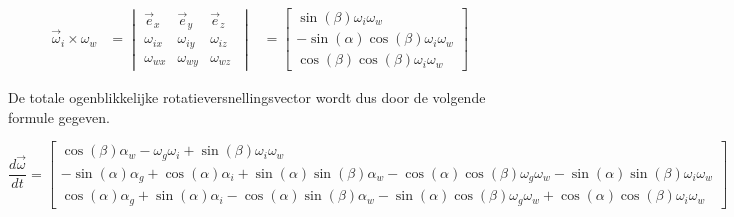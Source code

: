 \begin{equation*}
\begin{split}
\overrightarrow{\omega}_{i}\times\omega_{w}
&=	\begin{vmatrix}
	\overrightarrow{e}_{x} & \overrightarrow{e}_{y} & \overrightarrow{e}_{z}\\
	\omega_{ix} & \omega_{iy} & \omega_{iz}\\
	\omega_{wx} & \omega_{wy} & \omega_{wz}\
	\end{vmatrix}
&=	\begin{bmatrix}
	\sin(\beta)\omega_{i}\omega_{w}\\
	-\sin(\alpha)\cos(\beta)\omega_{i}\omega_{w}\\
	\cos(\beta)\cos(\beta)\omega_{i}\omega_{w}\
	\end{bmatrix}
\end{split}
\end{equation*}

De totale ogenblikkelijke rotatieversnellingsvector wordt dus door de volgende formule gegeven.

\begin{equation*}
\frac{d\overrightarrow{\omega}}{dt}
=	\begin{bmatrix}
\cos(\beta)\alpha_{w}-\omega_{g}\omega_{i}+\sin(\beta)\omega_{i}\omega_{w}\\
-\sin(\alpha)\alpha_{g}+\cos(\alpha)\alpha_{i}+\sin(\alpha)\sin(\beta)\alpha_{w}-\cos(\alpha)\cos(\beta)\omega_{g}\omega_{w}-\sin(\alpha)\sin(\beta)\omega_{i}\omega_{w}\\
\cos(\alpha)\alpha_{g}+\sin(\alpha)\alpha_{i}-\cos(\alpha)\sin(\beta)\alpha_{w}-\sin(\alpha)\cos(\beta)\omega_{g}\omega_{w}+\cos(\alpha)\cos(\beta)\omega_{i}\omega_{w}\
\end{bmatrix}
\end{equation*}